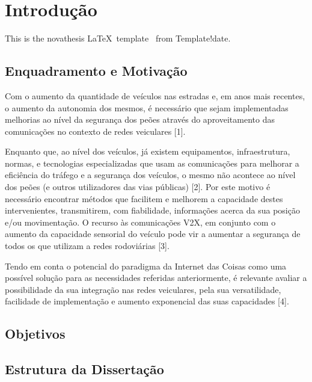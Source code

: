 
%

\chapter{Introdução}
\label{cha:introdução}

\noindent This is the \gls{novathesis} \LaTeX\ template  \novathesisversion\ from   {Template!date}\novathesisdate.

\section{Enquadramento e Motivação}
\label{sec:Enquadramento_e_Motivação}

Com o aumento da quantidade de veículos nas estradas e, em anos mais recentes, o aumento da autonomia dos mesmos,
é necessário que sejam implementadas melhorias ao nível da segurança dos peões através do aproveitamento das
comunicações no contexto de redes veiculares [1].
\par{Enquanto que, ao nível dos veículos, já existem equipamentos, infraestrutura, normas, e tecnologias especializadas que
usam as comunicações para melhorar a eficiência do tráfego e a segurança dos veículos, o mesmo não acontece ao nível
dos peões (e outros utilizadores das vias públicas) [2]. Por este motivo é necessário encontrar métodos que facilitem e
melhorem a capacidade destes intervenientes, transmitirem, com fiabilidade, informações acerca da sua posição e/ou
movimentação. O recurso às comunicações V2X, em conjunto com o aumento da capacidade sensorial do veículo pode
vir a aumentar a segurança de todos os que utilizam a redes rodoviárias [3].}
\par{Tendo em conta o potencial do paradigma da Internet das Coisas como uma possível solução para as necessidades
referidas anteriormente, é relevante avaliar a possibilidade da sua integração nas redes veiculares, pela sua versatilidade,
facilidade de implementação e aumento exponencial das suas capacidades [4].}

\section{Objetivos}
\label{}

\section{Estrutura da Dissertação}
\label{}

